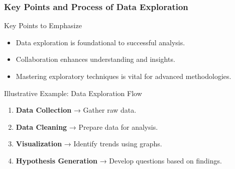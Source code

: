 \documentclass[aspectratio=169]{beamer}
\begin{document}
\begin{frame}[fragile]
    \frametitle{Key Points and Process of Data Exploration}
    \begin{block}{Key Points to Emphasize}
        \begin{itemize}
            \item Data exploration is foundational to successful analysis.
            \item Collaboration enhances understanding and insights.
            \item Mastering exploratory techniques is vital for advanced methodologies.
        \end{itemize}
    \end{block}
    
    \begin{block}{Illustrative Example: Data Exploration Flow}
        \begin{enumerate}
            \item \textbf{Data Collection} → Gather raw data.
            \item \textbf{Data Cleaning} → Prepare data for analysis.
            \item \textbf{Visualization} → Identify trends using graphs.
            \item \textbf{Hypothesis Generation} → Develop questions based on findings.
        \end{enumerate}
    \end{block}
\end{frame}
\end{document}
